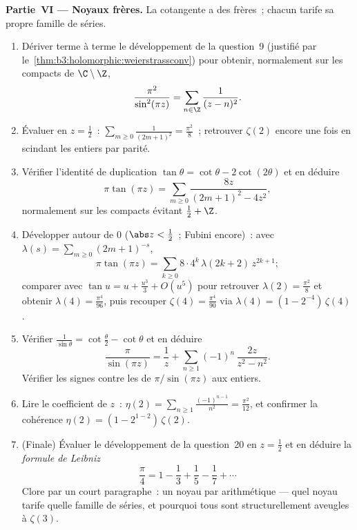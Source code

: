 \begin{problem}
\medskip
\noindent\textbf{Partie~VI --- Noyaux frères.} La cotangente
a des frères~; chacun tarife sa propre famille de séries.
\begin{enumerate}[resume]
  \item Dériver terme à terme le développement de la
        question~9 (justifié par
        le~\cref{thm:b3:holomorphic:weierstrassconv}) pour
        obtenir, normalement sur les compacts de
        $\C\setminus\Z$,
        \[
        \frac{\pi^2}{\sin^2(\pi z)} =
        \sum_{n\in\Z}\frac1{(z - n)^2} .
        \]
  \item Évaluer en $z = \frac12$~:
        $\sum_{m\geq0}\frac1{(2m+1)^2} = \frac{\pi^2}8$~;
        retrouver $\zeta(2)$ encore une fois en scindant les
        entiers par parité.
  \item Vérifier l'identité de duplication $\tan\theta =
        \cot\theta - 2\cot(2\theta)$ et en déduire
        \[
        \pi\tan(\pi z) =
        \sum_{m\geq0}\frac{8z}{(2m+1)^2 - 4z^2} ,
        \]
        normalement sur les compacts évitant $\frac12 + \Z$.
  \item Développer autour de $0$ ($\abs z < \frac12$~;
        Fubini encore)~: avec $\lambda(s) =
        \sum_{m\geq0}(2m+1)^{-s}$,
        \[
        \pi\tan(\pi z) =
        \sum_{k\geq0}8\cdot4^k\,\lambda(2k+2)\,z^{2k+1} ;
        \]
        comparer avec $\tan u = u + \frac{u^3}3 + O(u^5)$
        pour retrouver $\lambda(2) = \frac{\pi^2}8$ et
        obtenir $\lambda(4) = \frac{\pi^4}{96}$, puis
        recouper $\zeta(4) = \frac{\pi^4}{90}$ via
        $\lambda(4) = (1 - 2^{-4})\,\zeta(4)$.
  \item Vérifier $\frac1{\sin\theta} = \cot\frac\theta2 -
        \cot\theta$ et en déduire
        \[
        \frac{\pi}{\sin(\pi z)} = \frac1z +
        \sum_{n\geq1}(-1)^n\,\frac{2z}{z^2 - n^2} .
        \]
        Vérifier les signes contre les  de
        $\pi/\sin(\pi z)$ aux entiers.
  \item Lire le coefficient de $z$~: $\eta(2) =
        \sum_{n\geq1}\frac{(-1)^{n-1}}{n^2} =
        \frac{\pi^2}{12}$, et confirmer la cohérence
        $\eta(2) = (1 - 2^{1-2})\,\zeta(2)$.
  \item (Finale) Évaluer le développement de la question~20
        en $z = \frac12$ et en déduire la \emph{formule de
        Leibniz}
        \[
        \frac\pi4 = 1 - \frac13 + \frac15 - \frac17 +
        \cdots
        \]
        Clore par un court paragraphe~: un noyau par
        arithmétique --- quel noyau tarife quelle famille de
        séries, et pourquoi tous sont structurellement
        aveugles à $\zeta(3)$.


\end{enumerate}
\end{problem}
